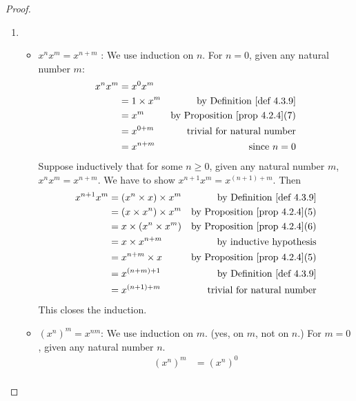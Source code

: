 \begin{proof}
\begin{enumerate}
    \item
        \begin{itemize}
            \item \(x^nx^m = x^{n+m}\) :
                We use induction on \(n\).
                For \(n = 0\), given any natural number \(m\):
                \begin{align*}
                    x^nx^m & = x^0x^m \\
                           & = 1 \X x^m & \text{by \DEF{4.3.9}} \\
                           & = x^m & \text{by \PROP{4.2.4}(7)} \\
                           & = x^{0 + m} & \text{trivial for natural number} \\
                           & = x^{n + m} & \text{since \(n = 0\)}
                \end{align*}
                Suppose inductively that for some \(n \ge 0\), given any natural number \(m\), \(x^nx^m = x^{n+m}\).
                We have to show \(x^{n+1}x^m = x^{(n+1)+m}\).
                Then
                \begin{align*}
                    x^{n+1}x^m & = (x^n \X x) \X x^m & \text{by \DEF{4.3.9}} \\
                               & = (x \X x^n) \X x^m & \text{by \PROP{4.2.4}(5)} \\
                               & = x \X (x^n \X x^m) & \text{by \PROP{4.2.4}(6)} \\
                               & = x \X x^{n + m} & \text{by inductive hypothesis} \\
                               & = x^{n + m} \X x & \text{by \PROP{4.2.4}(5)} \\
                               & = x^{(n + m) + 1} & \text{by \DEF{4.3.9}} \\
                               & = x^{(n +1) + m} & \text{trivial for natural number}
                \end{align*}
                This closes the induction.
            \item \((x^n)^m = x^{nm}\):
                We use induction on \(m\). (yes, on \(m\), not on \(n\).)
                For \(m = 0\), given any natural number \(n\).
                \begin{align*}
                    (x^n)^m & = (x^n)^0 \\

\end{align*}
\end{itemize}
\end{enumerate}
\end{proof}
